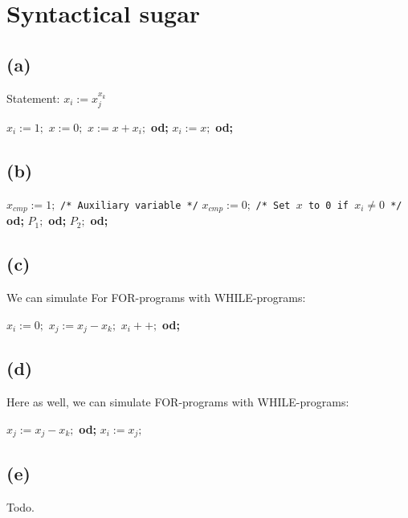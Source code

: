 

\usepackage{algorithm}
\usepackage[noend]{algpseudocode}

\setcounter{section}{1}

\section{Syntactical sugar}

\subsection{(a)}

Statement: \( x_i := x_j^{x_k} \)

\begin{algorithmic}[1]
\State \( x_i := 1; \)
    \State \( x := 0; \)
        \State \( x := x + x_i; \)
    \EndFor \textbf{od;}
    \State \( x_i := x; \)
\EndFor \textbf{od;}
\end{algorithmic}


\subsection{(b)}

\begin{algorithmic}[1]
\State \( x_{cmp} := 1; \) \texttt{/* Auxiliary variable */} 
    \State \( x_{cmp} := 0; \) \texttt{/* Set \( x \) to 0 if \( x_i \neq 0 \) */}
\EndFor \textbf{od;}
     \( P_1; \)
\EndFor \textbf{od;}
    \State\( P_2; \)
\EndFor \textbf{od;}
\end{algorithmic}


\subsection{(c)}
We can simulate For FOR-programs with WHILE-programs:

\begin{algorithmic}[1]
\State \( x_i := 0; \)
    \State \( x_j := x_j - x_k; \)
    \State \( x_i++; \)
\EndWhile \textbf{od;}
\end{algorithmic}
\subsection{(d)}
Here as well, we can simulate FOR-programs with WHILE-programs:

\begin{algorithmic}[1]
    \State \( x_j := x_j - x_k; \)
\EndWhile \textbf{od;}
\State \( x_i := x_j; \)
\end{algorithmic}

\subsection{(e)}

Todo.



